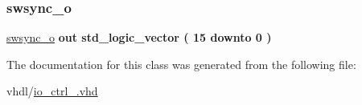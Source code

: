 \mbox{\label{classio__ctrl_a0d67cc1091d658566c78f05fa744f4a0}} 
\subsubsection{\texorpdfstring{swsync\+\_\+o}{swsync\_o}}
{\footnotesize\ttfamily \hyperlink{classio__ctrl_a0d67cc1091d658566c78f05fa744f4a0}{swsync\+\_\+o} {\bfseries \textcolor{keywordflow}{out}\textcolor{vhdlchar}{ }} {\bfseries \textcolor{comment}{std\+\_\+logic\+\_\+vector}\textcolor{vhdlchar}{ }\textcolor{vhdlchar}{(}\textcolor{vhdlchar}{ }\textcolor{vhdlchar}{ } \textcolor{vhdldigit}{15} \textcolor{vhdlchar}{ }\textcolor{keywordflow}{downto}\textcolor{vhdlchar}{ }\textcolor{vhdlchar}{ } \textcolor{vhdldigit}{0} \textcolor{vhdlchar}{ }\textcolor{vhdlchar}{)}\textcolor{vhdlchar}{ }} \hspace{0.3cm}{\ttfamily [Port]}}



The documentation for this class was generated from the following file\+:\begin{DoxyCompactItemize}
\item 
vhdl/\hyperlink{io__ctrl___8vhd}{io\+\_\+ctrl\+\_\+.\+vhd}\end{DoxyCompactItemize}

